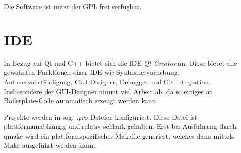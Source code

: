 Die Software ist unter der \ac{GPL} frei verfügbar.

\section{IDE} %

In Bezug auf Qt und C++ bietet sich die IDE \emph{Qt Creator} \cite{QtCreator} an. 
Diese bietet alle gewohnten Funktionen einer IDE wie Syntaxhervorhebung, Autovervollständigung, GUI-Designer, Debugger und Git-Integration.
Insbesondere der GUI-Designer nimmt viel Arbeit ab, da so einiges an Boilerplate-Code automatisch erzeugt werden kann.

Projekte werden in sog. \emph{.pro} Dateien konfiguriert. 
Diese Datei ist plattformunabhängig und relativ schlank gehalten. 
Erst bei Ausführung durch qmake wird ein plattformspezifisches Makefile generiert, welches dann mittels Make ausgeführt werden kann.
































